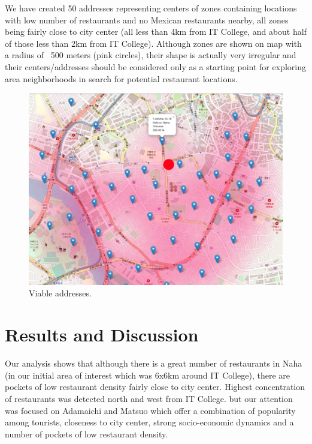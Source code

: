 \documentclass[11pt]{article}
\begin{document}
We have created 50 addresses representing centers of zones containing locations with low number of restaurants and no Mexican restaurants nearby, all zones being fairly close to city center (all less than 4km from IT College, and about half of those less than 2km from IT College). Although zones are shown on map with a radius of ~500 meters (pink circles), their shape is actually very irregular and their centers/addresses should be considered only as a starting point for exploring area neighborhoods in search for potential restaurant locations. 


\begin{figure}[H]
    \centering
        \includegraphics[scale=.5]{figures/cm15.png}
    \caption{ Viable addresses.}
    \label{fig:1}
\end{figure}

\section{Results and Discussion}

Our analysis shows that although there is a great number of restaurants in Naha (in our initial area of interest which was 6x6km around IT College), there are pockets of low restaurant density fairly close to city center. Highest concentration of restaurants was detected north and west from IT College. but our attention was focused on Adamaichi and Matsuo which offer a combination of popularity among tourists, closeness to city center, strong socio-economic dynamics and a number of pockets of low restaurant density.
\end{document}
